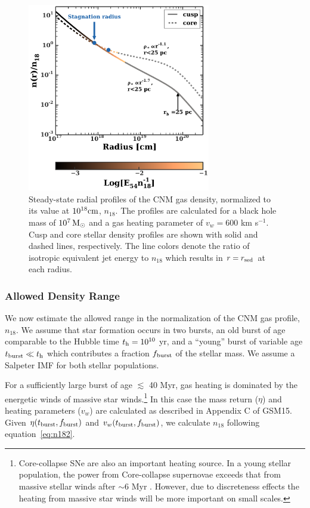 \documentclass[usenatbib,fleqn]{mnras}
\newcommand{\Msun}{{\rm M_\odot}}
\begin{document}
\begin{figure}
\includegraphics[width=8cm]{sedov_radius.pdf}
\caption{\label{fig:profiles} Steady-state radial profiles of the CNM
  gas density, normalized to its value at $10^{18} {\rm cm}$,
  $n_{18}$. The profiles are calculated for a black hole mass of
  $10^{7} \,\Msun$ and a gas heating parameter of $v_w=600$ km
  s$^{-1}$.  Cusp and core stellar density profiles are shown with
  solid and dashed lines, respectively.  The line colors denote the
  ratio of isotropic equivalent jet energy to $n_{18}$ which results
  in $r = r_{\rm sed}$ at each radius.}
\end{figure}

\subsubsection{Allowed Density Range}
\label{sec:densAllowed}
We now estimate the allowed range in the normalization of the CNM gas
profile, $n_{18}$.  We assume that star formation occurs in two
bursts, an old burst of age comparable to the Hubble time $t_{\rm h} =
10^{10}$ yr, and a ``young'' burst of variable age $t_{\rm burst} \ll
t_{\rm h}$ which contributes a fraction $f_{\rm burst}$ of the stellar
mass. We assume a Salpeter IMF for both stellar populations.

For a sufficiently large burst of age $\lesssim$ 40 Myr, gas heating
is dominated by the energetic winds of massive star
winds.\footnote{Core-collapse SNe are also an important heating
  source.  In a young stellar population, the power from Core-collapse
  supernovae exceeds that from massive stellar winds after $\sim$6 Myr
  \citep{Voss+2009}. However, due to discreteness effects the heating
  from massive star winds will be more important on small scales.}  In
this case the mass return ($\eta$) and heating parameters ($v_w$) are
calculated as described in Appendix C of GSM15.
Given
$\eta(t_{\rm burst},f_{\rm burst})$ and $v_w(t_{\rm burst},f_{\rm
  burst})$, we calculate $n_{18}$ following equation~\eqref{eq:n182}.
\end{document}
